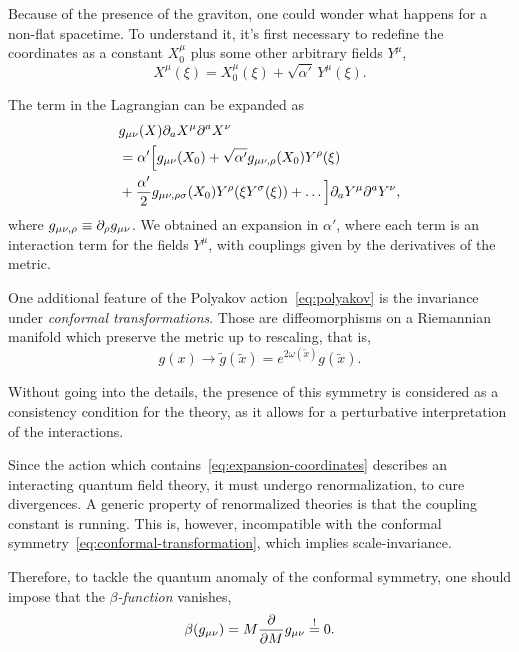 Because of the presence of the graviton, one could wonder what happens for a non-flat spacetime. To understand it, it's first necessary to redefine the coordinates as a constant $X^\mu_0$ plus some other arbitrary fields $Y^\mu$,
\begin{equation}
    X^\mu (\xi) = X^\mu_0 (\xi) + \sqrt{\alpha'} \, Y^\mu (\xi).
\end{equation}

The term in the Lagrangian can be expanded as
\begin{equation}\label{eq:expansion-coordinates}
\begin{split}
    &g_{\mu\nu}(X) \partial_a X^\mu \partial^a X^\nu \\
    &= \alpha' \Bigl[ g_{\mu\nu}(X_0) + \sqrt{\alpha'} g_{\mu\nu,\rho}(X_0)Y^\rho(\xi) \\ &+ \frac{\alpha'}{2} g_{\mu\nu,\rho\sigma}(X_0)Y^\rho(\xi Y^\sigma(\xi)) + \dots \Bigr] \partial_a Y^\mu \partial^a Y^\nu ,
\end{split}
\end{equation}
where $g_{\mu\nu,\rho} \equiv \partial_\rho g_{\mu\nu}$. We obtained an expansion in $\alpha'$, where each term is an interaction term for the fields $Y^\mu$, with couplings given by the derivatives of the metric. 

One additional feature of the Polyakov action~\eqref{eq:polyakov} is the invariance under \emph{conformal transformations}. Those are diffeomorphisms on a Riemannian manifold which preserve the metric up to rescaling, that is,
\begin{equation}\label{eq:conformal-transformation}
    g(x) \to \tilde{g}(\tilde{x}) = e^{2\omega(\tilde{x})} g(\tilde{x}).
\end{equation}

Without going into the details, the presence of this symmetry is considered as a consistency condition for the theory, as it allows for a perturbative interpretation of the interactions. 

Since the action which contains~\eqref{eq:expansion-coordinates} describes an interacting quantum field theory, it must undergo renormalization, to cure divergences. A generic property of renormalized theories is that the coupling constant is running. This is, however, incompatible with the conformal symmetry~\eqref{eq:conformal-transformation}, which implies scale-invariance.

Therefore, to tackle the quantum anomaly of the conformal symmetry, one should impose that the \emph{$\beta$-function} vanishes,
\begin{equation}
    \beta(g_{\mu\nu}) = M \frac{\partial}{\partial M} g_{\mu\nu} \overset{!}{=} 0.
\end{equation}

